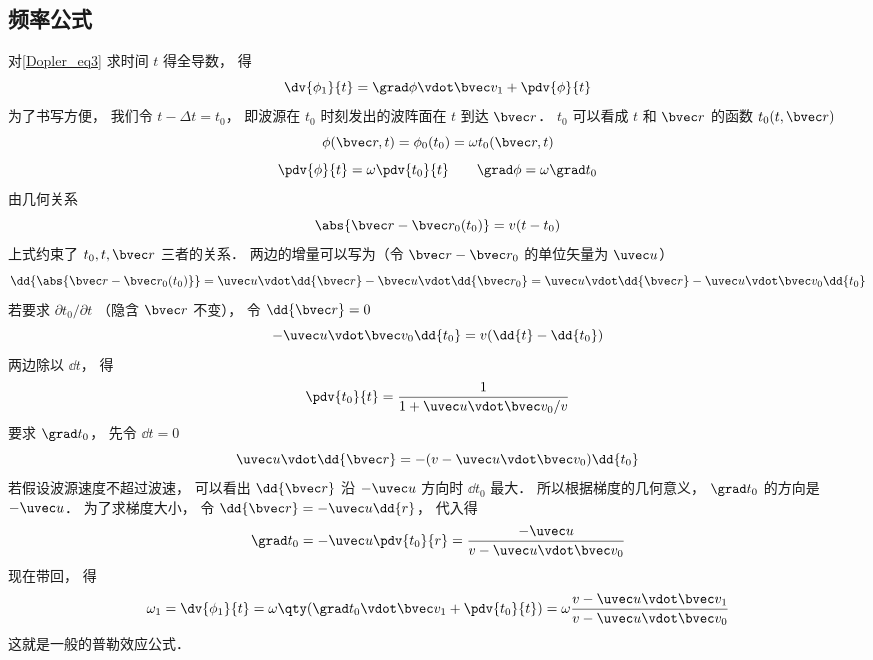 \subsection{频率公式}
对\autoref{Dopler_eq3} 求时间 $t$ 得全导数， 得
\begin{equation}
\dv{\phi_1}{t} = \grad\phi \vdot \bvec v_1 + \pdv{\phi}{t}
\end{equation}
为了书写方便， 我们令 $t - \Delta t = t_0$， 即波源在 $t_0$ 时刻发出的波阵面在 $t$ 到达 $\bvec r$． $t_0$ 可以看成 $t$ 和 $\bvec r$ 的函数  $t_0(t, \bvec r)$
\begin{equation}
\phi(\bvec r, t) =  \phi_0(t_0) = \omega t_0(\bvec r, t)
\end{equation}
\begin{equation}
\pdv{\phi}{t} = \omega \pdv{t_0}{t} \qquad
\grad \phi = \omega \grad t_0
\end{equation}
由几何关系
\begin{equation}
\abs{\bvec r - \bvec r_0(t_0)} = v(t - t_0)
\end{equation}
上式约束了 $t_0, t, \bvec r$ 三者的关系． 两边的增量可以写为（令 $\bvec r - \bvec r_0$ 的单位矢量为 $\uvec u$）
\begin{equation}
\dd{\abs{\bvec r - \bvec r_0(t_0)}} = \uvec u \vdot \dd{\bvec r} - \bvec u \vdot \dd{\bvec r_0} = \uvec u \vdot \dd{\bvec r} - \uvec u \vdot \bvec v_0 \dd{t_0}
\end{equation}
若要求 $\partial t_0 / \partial t$ （隐含 $\bvec r$ 不变）， 令 $\dd{\bvec r} = 0$
\begin{equation}
-\uvec u \vdot \bvec v_0 \dd{t_0} = v(\dd{t} - \dd{t_0})
\end{equation}
两边除以 $\dd{t}$， 得
\begin{equation}
\pdv{t_0}{t} = \frac{1}{1 + \uvec u \vdot \bvec v_0/v}
\end{equation}
要求 $\grad t_0$， 先令 $\dd{t} = 0$
\begin{equation}
\uvec u \vdot \dd{\bvec r} = -(v - \uvec u \vdot \bvec v_0) \dd{t_0}
\end{equation}
若假设波源速度不超过波速， 可以看出 $\dd{\bvec r}$ 沿 $-\uvec u$ 方向时 $\dd{t_0}$ 最大． 所以根据梯度的几何意义， $\grad t_0$ 的方向是 $-\uvec u$． 为了求梯度大小， 令 $\dd{\bvec r} = -\uvec u \dd{r}$， 代入得
\begin{equation}
\grad t_0 = -\uvec u \pdv{t_0}{r} = \frac{ - \uvec u}{v - \uvec u \vdot \bvec v_0}
\end{equation}
现在带回， 得
\begin{equation}
\omega_1 = \dv{\phi_1}{t} = \omega\qty(\grad t_0 \vdot \bvec v_1 + \pdv{t_0}{t}) = \omega \frac{v - \uvec u \vdot \bvec v_1}{v - \uvec u \vdot \bvec v_0}
\end{equation}
这就是一般的普勒效应公式．
